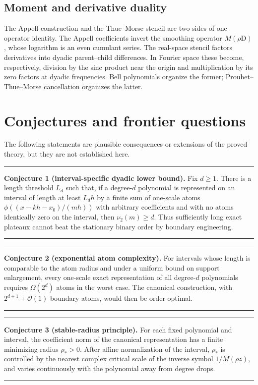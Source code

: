 \documentclass[11pt,oneside]{article}
\theoremstyle{definition}
\theoremstyle{remark}
\newcommand{\vtwo}{\nu_2}
\newcommand{\D}{\mathrm D}
\newcommand{\bigO}{\mathcal O}
\newenvironment{conjecturebox}{%
  \par\smallskip\noindent\begin{center}\begin{minipage}{0.94\textwidth}%
  \hrule\vspace{0.6em}\small
}{%
  \vspace{0.6em}\hrule\end{minipage}\end{center}\smallskip
}
\begin{document}
\subsection{Moment and derivative duality}

The Appell construction and the Thue--Morse stencil are two sides of one
operator identity.  The Appell coefficients invert the smoothing operator
\(M(\rho\D)\), whose logarithm is an even cumulant series.  The real-space
stencil factors derivatives into dyadic parent--child differences.  In Fourier
space these become, respectively, division by the sinc product near the
origin and multiplication by its zero factors at dyadic frequencies.  Bell
polynomials organize the former; Prouhet--Thue--Morse cancellation organizes
the latter.

\section{Conjectures and frontier questions}
\label{sec:conjectures}

The following statements are plausible consequences or extensions of the
proved theory, but they are not established here.

\begin{conjecturebox}
\textbf{Conjecture 1 (interval-specific dyadic lower bound).}
Fix \(d\ge1\).  There is a length threshold \(L_d\) such that, if a degree-\(d\)
polynomial is represented on an interval of length at least \(L_dh\) by a
finite sum of one-scale atoms
\(\phi((x-kh-x_0)/(mh))\) with arbitrary coefficients and with no atoms
identically zero on the interval, then \(\vtwo(m)\ge d\).  Thus sufficiently
long exact plateaux cannot beat the stationary binary order by boundary
engineering.
\end{conjecturebox}

\begin{conjecturebox}
\textbf{Conjecture 2 (exponential atom complexity).}
For intervals whose length is comparable to the atom radius and under a
uniform bound on support enlargement, every one-scale exact representation of
all degree-\(d\) polynomials requires \(\Omega(2^d)\) atoms in the worst case.
The canonical construction, with \(2^{d+1}+\bigO(1)\) boundary atoms, would
then be order-optimal.
\end{conjecturebox}

\begin{conjecturebox}
\textbf{Conjecture 3 (stable-radius principle).}
For each fixed polynomial and interval, the coefficient norm of the canonical
representation has a finite minimizing radius \(\rho_*>0\).  After affine
normalization of the interval, \(\rho_*\) is controlled by the nearest complex
critical scale of the inverse symbol \(1/M(\rho z)\), and varies continuously
with the polynomial away from degree drops.
\end{conjecturebox}
\end{document}
